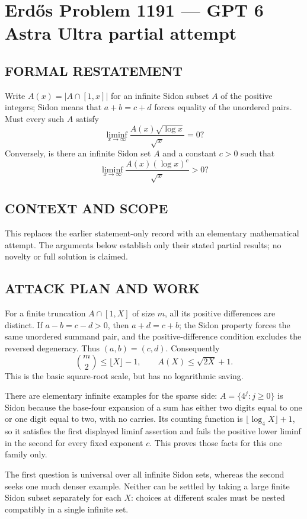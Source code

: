 \section*{Erd\H{o}s Problem 1191 --- GPT 6 Astra Ultra partial attempt}


\subsection*{FORMAL RESTATEMENT}
Write $A(x)=|A\cap[1,x]|$ for an infinite Sidon subset $A$ of the positive integers; Sidon means that $a+b=c+d$ forces equality of the unordered pairs. Must every such $A$ satisfy
\[\liminf_{x\to\infty}\frac{A(x)\sqrt{\log x}}{\sqrt x}=0?\]
Conversely, is there an infinite Sidon set $A$ and a constant $c>0$ such that
\[\liminf_{x\to\infty}\frac{A(x)(\log x)^c}{\sqrt x}>0?\]

\subsection*{CONTEXT AND SCOPE}
This replaces the earlier statement-only record with an elementary mathematical attempt. The arguments below establish only their stated partial results; no novelty or full solution is claimed.

\subsection*{ATTACK PLAN AND WORK}
For a finite truncation $A\cap[1,X]$ of size $m$, all its positive differences
are distinct. If $a-b=c-d>0$, then $a+d=c+b$; the Sidon property forces
the same unordered summand pair, and the positive-difference condition excludes
the reversed degeneracy. Thus $(a,b)=(c,d)$. Consequently
\[\binom m2\le\lfloor X\rfloor-1,\qquad A(X)\le\sqrt{2X}+1.\tag{1}\]
This is the basic square-root scale, but has no logarithmic saving.

There are elementary infinite examples for the sparse side: $A=\{4^j:j\ge0\}$
is Sidon because the base-four expansion of a sum has either two digits equal
to one or one digit equal to two, with no carries. Its counting function is
$\lfloor\log_4 X\rfloor+1$, so it satisfies the first displayed liminf assertion
and fails the positive lower liminf in the second for every fixed exponent $c$.
This proves those facts for this one family only.

The first question is universal over all infinite Sidon sets, whereas the
second seeks one much denser example. Neither can be settled by taking a large
finite Sidon subset separately for each $X$: choices at different scales must
be nested compatibly in a single infinite set.

